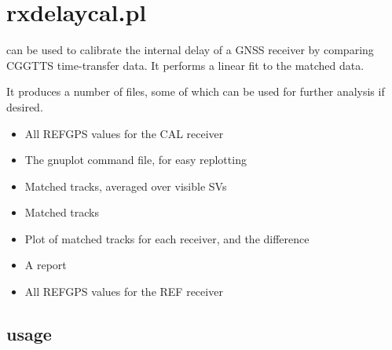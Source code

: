

\section{rxdelaycal.pl \label{s:rxdelaycal}} 

\hypertarget{h:rxdelaycal}{}

 can be used to calibrate the internal delay of a GNSS receiver by comparing CGGTTS time-transfer data.
It performs a linear fit to the matched data.

It produces a number of files, some of which can be used for further analysis if desired.
\begin{itemize}
\item {} All REFGPS values for the CAL receiver
\item {} The gnuplot command file, for easy replotting
\item {} Matched tracks, averaged over visible SVs
\item {} Matched tracks
\item {} Plot of matched tracks for each receiver, and the difference
\item {} A report 
\item {} All REFGPS values for the REF receiver
\end{itemize}

\subsection{usage}

